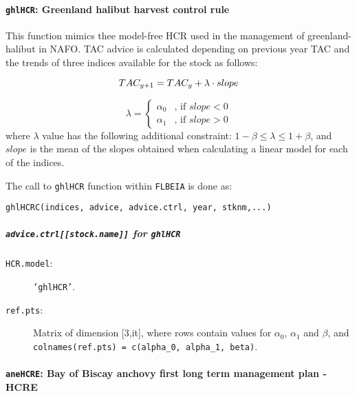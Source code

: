 \paragraph{\texttt{ghlHCR}: Greenland halibut harvest control rule} \hspace{0pt} \smallskip

  This function mimics thee model-free HCR used in the management of greenland-halibut in NAFO.
  TAC advice is calculated depending on previous year TAC and the trends of three indices available for the stock as follows:

  \begin{equation}
  	TAC_{y+1} =  TAC_y + \lambda \cdot slope \\
  \end{equation}

  \begin{equation}
  	\lambda =
  	\begin{cases}
				\alpha_0 & \text{, if } slope < 0 \\
				\alpha_1 & \text{, if } slope > 0
  	\end{cases}
  \end{equation}
  \noindent where $\lambda$ value has the following additional constraint: $1 - \beta \leq \lambda \leq 1 + \beta$, and 
  $slope$ is the mean of the slopes obtained when calculating a linear model for each of the indices.

  The call to \texttt{ghlHCR} function within \texttt{FLBEIA} is done as:

	\begin{center}
		\texttt{ghlHCRC(indices, advice, advice.ctrl, year, stknm,...)}
	\end{center}

	\subparagraph{\texttt{advice.ctrl[[stock.name]]} for \texttt{ghlHCR}}

	\begin{description}
	    \item[\texttt{HCR.model}:] \texttt{'ghlHCR'}.
		  \item[\texttt{ref.pts}:] Matrix of dimension [3,it], 
		    where rows contain values for $\alpha_0$, $\alpha_1$ and $\beta$,
		    and \texttt{colnames(ref.pts) = c(alpha\_0, alpha\_1, beta)}.
		    
	\end{description}


\paragraph{\texttt{aneHCRE}: Bay of Biscay anchovy first long term management plan - HCRE} \hspace{0pt} \smallskip

